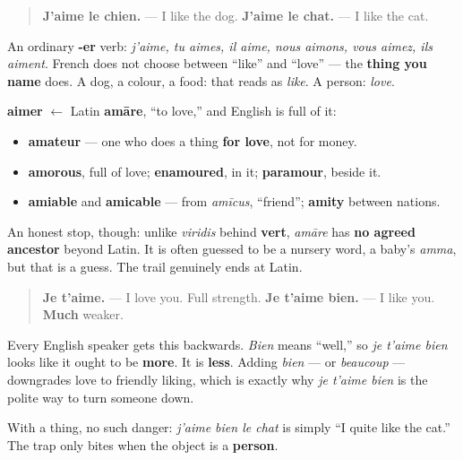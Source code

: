 \begin{quote}
\textbf{J'aime le chien.} — I like the dog. \textbf{J'aime le chat.} — I like the cat.
\end{quote}

An ordinary \textbf{-er} verb: \emph{j'aime, tu aimes, il aime, nous aimons, vous aimez, ils aiment}. French does not choose between \textquotedblleft{}like\textquotedblright{} and \textquotedblleft{}love\textquotedblright{} — the \textbf{thing you name} does. A dog, a colour, a food: that reads as \emph{like}. A person: \emph{love}.

\begin{cousinweb}
\textbf{aimer} $\leftarrow$ Latin \textbf{amāre}, \textquotedblleft{}to love,\textquotedblright{} and English is full of it:

\begin{itemize}
\raggedright
  \item \textbf{amateur} — one who does a thing \textbf{for love}, not for money.
  \item \textbf{amorous}, full of love; \textbf{enamoured}, in it; \textbf{paramour}, beside it.
  \item \textbf{amiable} and \textbf{amicable} — from \emph{amīcus}, \textquotedblleft{}friend\textquotedblright{}; \textbf{amity} between nations.
\end{itemize}

An honest stop, though: unlike \emph{viridis} behind \textbf{vert}, \emph{amāre} has \textbf{no agreed ancestor} beyond Latin. It is often guessed to be a nursery word, a baby's \emph{amma}, but that is a guess. The trail genuinely ends at Latin.
\end{cousinweb}

\begin{culture}
\begin{quote}
\textbf{Je t'aime.} — I love you. Full strength. \textbf{Je t'aime bien.} — I like you. \textbf{Much} weaker.
\end{quote}

Every English speaker gets this backwards. \emph{Bien} means \textquotedblleft{}well,\textquotedblright{} so \emph{je t'aime bien} looks like it ought to be \textbf{more}. It is \textbf{less}. Adding \emph{bien} — or \emph{beaucoup} — downgrades love to friendly liking, which is exactly why \emph{je t'aime bien} is the polite way to turn someone down.

With a thing, no such danger: \emph{j'aime bien le chat} is simply \textquotedblleft{}I quite like the cat.\textquotedblright{} The trap only bites when the object is a \textbf{person}.
\end{culture}

